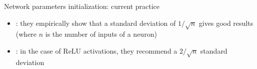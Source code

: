 \documentclass[xcolor=pdftex,dvipsnames,table,mathserif]{beamer}
\begin{document}
\begin{frame}{Network parameters initialization: current practice}

  \begin{itemize}
  \item \cite{glorot_understanding_2010}: they empirically show that a standard deviation of $1/\sqrt n$ gives good results (where $n$ is the number of inputs of a neuron)
  \item \cite{he_delving_2015}: in the case of ReLU activations, they recommend a $2/\sqrt  n$ standard deviation
  \end{itemize}

\end{frame}






\end{document}
